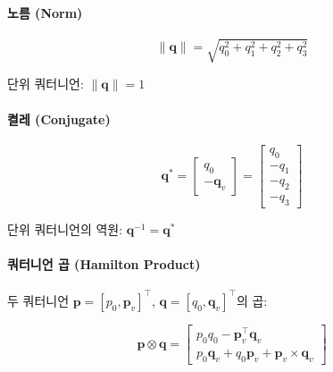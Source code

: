         \paragraph{노름 (Norm)}

            \begin{equation}
                \|\mathbf{q}\| = \sqrt{q_0^2 + q_1^2 + q_2^2 + q_3^2}
                \tag{A.4}
            \end{equation}
            
            단위 쿼터니언: $\|\mathbf{q}\| = 1$
 
        \paragraph{켤레 (Conjugate)}

            \begin{equation}
                \mathbf{q}^* = \begin{bmatrix} q_0 \\ -\mathbf{q}_v \end{bmatrix} =
                \begin{bmatrix} q_0 \\ -q_1 \\ -q_2 \\ -q_3 \end{bmatrix}
                \tag{A.5}
            \end{equation}
            
            단위 쿼터니언의 역원: $\mathbf{q}^{-1} = \mathbf{q}^*$

        \paragraph{쿼터니언 곱 (Hamilton Product)}
            두 쿼터니언 $\mathbf{p} = [p_0, \mathbf{p}_v]^\top$, $\mathbf{q} = [q_0, \mathbf{q}_v]^\top$의 곱:

            \begin{equation}
                \mathbf{p} \otimes \mathbf{q} =
                \begin{bmatrix}
                    p_0 q_0 - \mathbf{p}_v^\top \mathbf{q}_v \\
                    p_0 \mathbf{q}_v + q_0 \mathbf{p}_v + \mathbf{p}_v \times \mathbf{q}_v
                \end{bmatrix}
                \tag{A.6}
            \end{equation}
            
